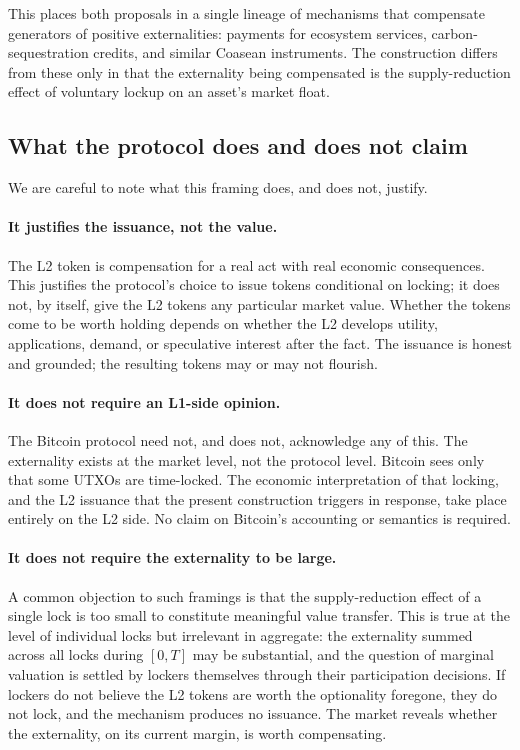 \documentclass[11pt,a4paper]{article}
\begin{document}
This places both proposals in a single lineage of mechanisms that compensate generators of positive externalities: payments for ecosystem services, carbon-sequestration credits, and similar Coasean instruments. The construction differs from these only in that the externality being compensated is the supply-reduction effect of voluntary lockup on an asset's market float.

\subsection{What the protocol does and does not claim}

We are careful to note what this framing does, and does not, justify.

\paragraph{It justifies the issuance, not the value.} The L2 token is compensation for a real act with real economic consequences. This justifies the protocol's choice to issue tokens conditional on locking; it does not, by itself, give the L2 tokens any particular market value. Whether the tokens come to be worth holding depends on whether the L2 develops utility, applications, demand, or speculative interest after the fact. The issuance is honest and grounded; the resulting tokens may or may not flourish.

\paragraph{It does not require an L1-side opinion.} The Bitcoin protocol need not, and does not, acknowledge any of this. The externality exists at the market level, not the protocol level. Bitcoin sees only that some UTXOs are time-locked. The economic interpretation of that locking, and the L2 issuance that the present construction triggers in response, take place entirely on the L2 side. No claim on Bitcoin's accounting or semantics is required.

\paragraph{It does not require the externality to be large.} A common objection to such framings is that the supply-reduction effect of a single lock is too small to constitute meaningful value transfer. This is true at the level of individual locks but irrelevant in aggregate: the externality summed across all locks during $[0, T]$ may be substantial, and the question of marginal valuation is settled by lockers themselves through their participation decisions. If lockers do not believe the L2 tokens are worth the optionality foregone, they do not lock, and the mechanism produces no issuance. The market reveals whether the externality, on its current margin, is worth compensating.
\end{document}
